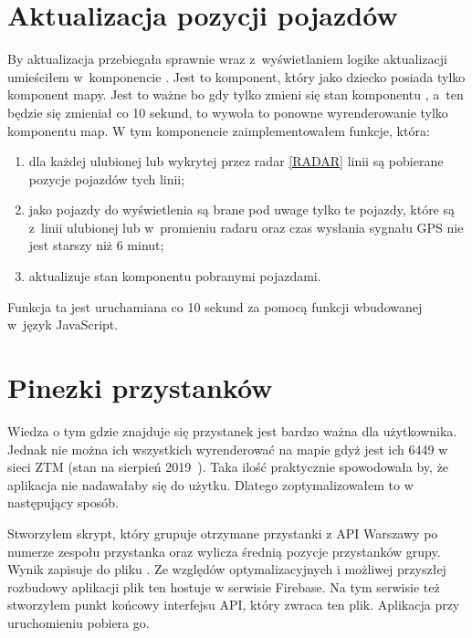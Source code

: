 \documentclass{SGGW-thesis}
\begin{document}
\section{Aktualizacja pozycji pojazdów}
By aktualizacja przebiegała sprawnie wraz z~wyświetlaniem logike aktualizacji umieściłem w~komponencie .
Jest to komponent, który jako dziecko posiada tylko komponent mapy.
Jest to ważne bo gdy tylko zmieni się stan komponentu , a~ten będzie się zmieniał co 10 sekund, to wywoła to ponowne wyrenderowanie tylko komponentu map.
W tym komponencie zaimplementowałem funkcje, która:
\begin{enumerate}
  \item{dla każdej ulubionej lub wykrytej przez radar \ref{RADAR} linii są pobierane pozycje pojazdów tych linii;}
  \item{jako pojazdy do wyświetlenia są brane pod uwage tylko te pojazdy, które są z~linii ulubionej lub w~promieniu radaru oraz czas wysłania sygnału GPS nie jest starszy niż 6 minut;}
  \item{aktualizuje stan komponentu  pobranymi pojazdami.}
\end{enumerate}
Funkcja ta jest uruchamiana co 10 sekund za pomocą funkcji  wbudowanej w~język JavaScript.

\section{Pinezki przystanków}
Wiedza o tym gdzie znajduje się przystanek jest bardzo ważna dla użytkownika.
Jednak nie można ich wszystkich wyrenderować na mapie gdyż jest ich 6449 w sieci ZTM (stan na sierpień 2019~\cite{ZTMSTATS}).
Taka ilość praktycznie spowodowała by, że aplikacja nie nadawałaby się do użytku.
Dlatego zoptymalizowałem to w następujący sposób.

\label{FIREBASE}
Stworzyłem skrypt, który grupuje otrzymane przystanki z API Warszawy po numerze zespołu przystanka oraz wylicza średnią pozycje przystanków grupy.
Wynik zapisuje do pliku .
Ze względów optymalizacyjnych i możliwej przyszłej rozbudowy aplikacji plik ten hostuje w serwisie Firebase.
Na tym serwisie też stworzyłem punkt końcowy interfejsu API, który zwraca ten plik.
Aplikacja przy uruchomieniu pobiera go.
\end{document}
